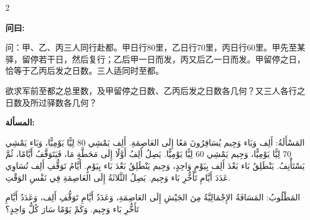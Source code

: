 \documentclass[11pt,a4paper]{article}
\newcommand{\ar}[1]{\arabicfont\beginR #1\endR}
\newenvironment{bilingual}{%
  \begin{paracol}{2}
}{%
  \end{paracol}
}
\newcommand{\cnlabel}[1]{\textcolor{algocolor}{\textbf{#1}}}
\newcommand{\arlabel}[1]{\ar{\textcolor{algocolor}{\textbf{#1}}}}
\begin{document}
\begin{bilingual}

\begin{leftcolumn*}
\cnlabel{问曰:}

问：甲、乙、丙三人同行赴都。甲日行80里，乙日行70里，丙日行60里。甲先至某驿，留停若干日，然后复行；乙后甲一日而发，丙又后乙一日而发。甲留停之日，恰等于乙丙后发之日数。三人适同时至都。

欲求军前至都之总里数，及甲留停之日数、乙丙后发之日数各几何？又三人各行之日数及所过驿数各几何？
\end{leftcolumn*}

\begin{rightcolumn*}
\arlabel{المسألة:}

\ar{المَسْأَلَةُ: أَلِف وَبَاء وَجِيم يُسَافِرُونَ مَعًا إِلَى العَاصِمَةِ. أَلِف يَمْشِي 80 لِيًّا يَوْمِيًّا، وَبَاء يَمْشِي 70 لِيًّا يَوْمِيًّا، وَجِيم يَمْشِي 60 لِيًّا يَوْمِيًّا. يَصِلُ أَلِفُ أَوَّلًا إِلَى مَحَطَّةٍ مَا، فَيَتَوَقَّفُ أَيَّامًا، ثُمَّ يَسْتَأْنِفُ. يَنْطَلِقُ بَاء بَعْدَ أَلِف بِيَوْمٍ وَاحِدٍ، وَجِيم يَنْطَلِقُ بَعْدَ بَاء بِيَوْمٍ. أَيَّامُ تَوَقُّفِ أَلِف تُسَاوِي عَدَدَ أَيَّامِ تَأَخُّرِ بَاء وَجِيم. يَصِلُ الثَّلاثَةُ إِلَى العَاصِمَةِ فِي نَفْسِ الوَقْتِ.}

\ar{المَطْلُوبُ: المَسَافَةُ الإِجْمَالِيَّةُ مِنَ الجَيْشِ إِلَى العَاصِمَةِ، وَعَدَدُ أَيَّامِ تَوَقُّفِ أَلِف، وَعَدَدُ أَيَّامِ تَأَخُّرِ بَاء وَجِيم. وَكَمْ يَوْمًا سَارَ كُلُّ وَاحِدٍ؟}
\end{rightcolumn*}

\end{bilingual}

\vspace{1em}
\end{document}
